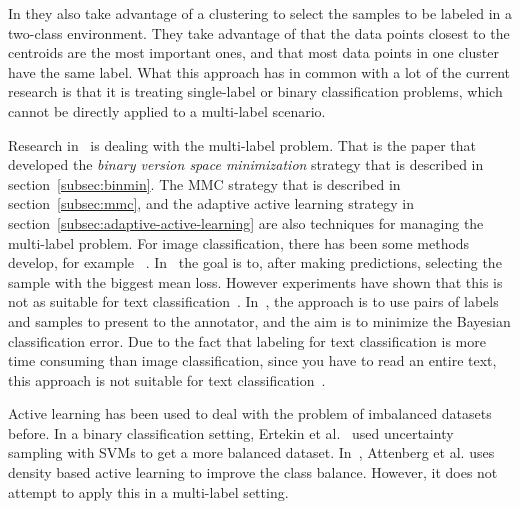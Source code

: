 In \cite{nguyen2004active} they also take advantage of a clustering to select the samples to be labeled in a two-class environment.
They take advantage of that the data points closest to the centroids are the most important ones, and that most data points in one cluster have the same label.
What this approach has in common with a lot of the current research is that it is treating single-label or binary classification problems, which cannot be directly applied to a multi-label scenario.

Research in~\cite{brinker2006active} is dealing with the multi-label problem.
That is the paper that developed the \textit{binary version space minimization} strategy that is described in section~\ref{subsec:binmin}.
The MMC strategy that is described in section~\ref{subsec:mmc}, and the adaptive active learning strategy in section~\ref{subsec:adaptive-active-learning} are also techniques for managing the multi-label problem.
For image classification, there has been some methods develop, for example ~\cite{li2004multilabel, qi2008two}.
In~\cite{li2004multilabel} the goal is to, after making predictions, selecting the sample with the biggest mean loss.
However experiments have shown that this is not as suitable for text classification~\cite{yang2009effective}.
In~\cite{qi2008two}, the approach is to use pairs of labels and samples to present to the annotator, and the aim is to minimize the Bayesian classification error.
Due to the fact that labeling for text classification is more time consuming than image classification, since you have to read an entire text, this approach is not suitable for text classification~\cite{yang2009effective}.

Active learning has been used to deal with the problem of imbalanced datasets before.
In a binary classification setting, Ertekin et al\@.~\cite{ertekin2007learning} used uncertainty sampling with SVMs to get a more balanced dataset.
In~\cite{attenberg2013class}, Attenberg et al\@. uses density based active learning to improve the class balance.
However, it does not attempt to apply this in a multi-label setting.